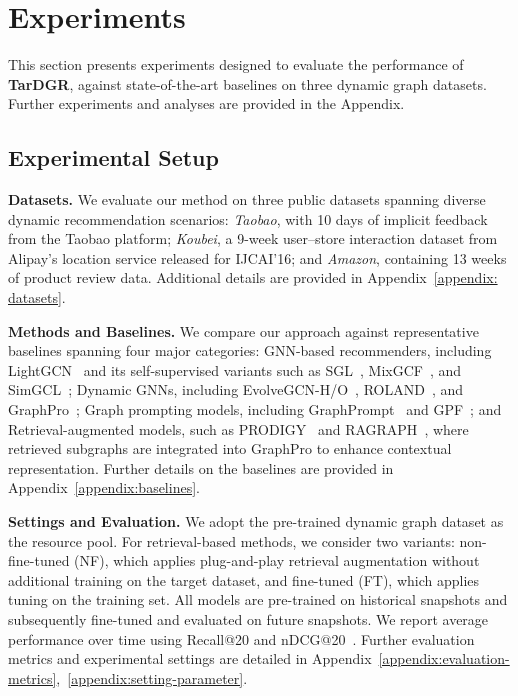 \documentclass[letterpaper]{article} %
\begin{document}
\section{Experiments}
\label{sec:experiments}
This section presents experiments designed to evaluate the performance of \textbf{TarDGR}, against state-of-the-art baselines on three dynamic graph datasets. Further experiments and analyses are provided in the Appendix.

\subsection{Experimental Setup}
\label{sec:exp setup}
\noindent\textbf{Datasets.} 
We evaluate our method on three public datasets spanning diverse dynamic recommendation scenarios: \textit{Taobao}, with 10 days of implicit feedback from the Taobao platform; \textit{Koubei}, a 9-week user–store interaction dataset from Alipay’s location service released for IJCAI’16; and \textit{Amazon}, containing 13 weeks of product review data. Additional details are provided in Appendix~\ref{appendix: datasets}.

\noindent\textbf{Methods and Baselines.}
We compare our approach against representative baselines spanning four major categories:
GNN-based recommenders, including LightGCN~\cite{he2020lightgcn} and its self-supervised variants such as SGL~\cite{sgl}, MixGCF~\cite{huang2021mixgcf}, and SimGCL~\cite{simgcl};
Dynamic GNNs, including EvolveGCN-H/O~\cite{pareja2020evolvegcn}, ROLAND~\cite{you2022roland}, and GraphPro~\cite{yang2024graphpro};
Graph prompting models, including GraphPrompt~\cite{graphprompt} and GPF~\cite{fang2023universal}; and
Retrieval-augmented models, such as PRODIGY~\cite{mishchenko2023prodigy} and RAGRAPH~\cite{jiang2024ragraph}, where retrieved subgraphs are integrated into GraphPro to enhance contextual representation.
Further details on the baselines are provided in Appendix~\ref{appendix:baselines}.

\noindent\textbf{Settings and Evaluation.}
We adopt the pre-trained dynamic graph dataset as the resource pool. For retrieval-based methods, we consider two variants: non-fine-tuned (NF), which applies plug-and-play retrieval augmentation without additional training on the target dataset, and fine-tuned (FT), which applies tuning on the training set. All models are pre-trained on historical snapshots and subsequently fine-tuned and evaluated on future snapshots. We report average performance over time using Recall@20 and nDCG@20~\cite{he2020lightgcn, simgcl}.
Further evaluation metrics and experimental settings are detailed in 
Appendix~\ref{appendix:evaluation-metrics},~\ref{appendix:setting-parameter}.
\end{document}
